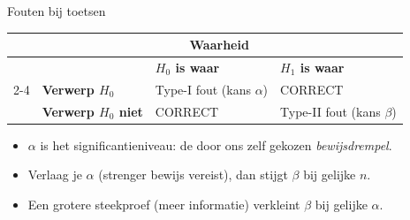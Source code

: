    \begin{frame}{Fouten bij toetsen}
        \begin{center}
            \renewcommand{\arraystretch}{1.5}
            \begin{tabular}{m{} m{} m{} m{}}
                & \multicolumn{3}{c}{Waarheid}\\
                \toprule
                                               & & \textbf{$H_0$ is waar} & \textbf{$H_1$ is waar} \\
                \cmidrule{2-4}
                    \multirow{2}{*}{\rotatebox{90}{Toetsuitslag}} & \textbf{Verwerp $H_0$}      & \cellcolor{red}Type-I fout \newline (kans $\alpha$) & \cellcolor{highlightcolor}CORRECT \\
                    & \textbf{Verwerp $H_0$ niet}  & \cellcolor{highlightcolor}CORRECT & \cellcolor{red}Type-II fout \newline (kans $\beta$) \\
                \bottomrule
            \end{tabular}
        \end{center}
        \vfill\pause
        \begin{itemize}[<+->]\setlength\itemsep{1em}
            \item $\alpha$ is het significantieniveau: de door ons zelf gekozen \emph{bewijsdrempel}.
            \item Verlaag je $\alpha$ (strenger bewijs vereist), dan stijgt $\beta$ bij gelijke $n$.
            \item Een grotere steekproef (meer informatie) verkleint $\beta$ bij gelijke $\alpha$.
        \end{itemize}
    \end{frame}

